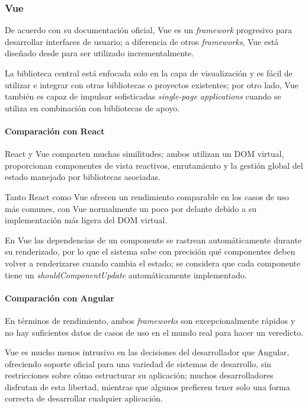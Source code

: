 \subsubsection*{Vue}

De acuerdo con su documentación oficial\cite{noauthor_que_nodate}, Vue es un \textit{framework} progresivo para desarrollar interfaces de usuario; a diferencia de otros \textit{frameworks}, Vue está diseñado desde para ser utilizado incrementalmente.


La biblioteca central está enfocada solo en la capa de visualización y es fácil de utilizar e integrar con otras bibliotecas o proyectos existentes; por otro lado, Vue también es capaz de impulsar sofisticadas \textit{single-page applications} cuando se utiliza en combinación con bibliotecas de apoyo.


\paragraph*{Comparación con React}

React y Vue comparten muchas similitudes; ambos utilizan un DOM virtual, proporcionan componentes de vista reactivos, enrutamiento y la gestión global del estado manejado por bibliotecas asociadas.


Tanto React como Vue ofrecen un rendimiento comparable en los casos de uso más comunes, con Vue normalmente un poco por delante debido a su implementación más ligera del DOM virtual.


En Vue las dependencias de un componente se rastrean automáticamente durante su renderizado, por lo que el sistema sabe con precisión qué componentes deben volver a renderizarse cuando cambia el estado; se considera que cada componente tiene un \textit{shouldComponentUpdate} automáticamente implementado.


\paragraph*{Comparación con Angular}
En términos de rendimiento, ambos \textit{frameworks} son excepcionalmente rápidos y no hay suficientes datos de casos de uso en el mundo real para hacer un veredicto.


Vue es mucho menos intrusivo en las decisiones del desarrollador que Angular, ofreciendo soporte oficial para una variedad de sistemas de desarrollo, sin restricciones sobre cómo estructurar su aplicación; muchos desarrolladores disfrutan de esta libertad, mientras que algunos prefieren tener solo una forma correcta de desarrollar cualquier aplicación.


